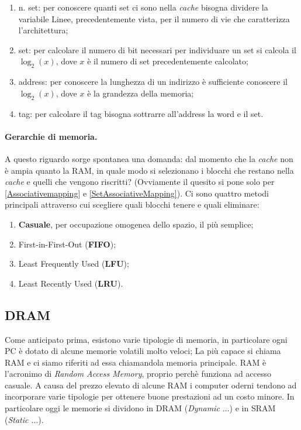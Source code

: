 \documentclass{article}
\begin{document}
\begin{enumerate}
\begin{enumerate}
  \item n. set: per conoscere quanti set ci sono nella \textit{cache} bisogna dividere la variabile Linee, precedentemente vista, per il numero di vie che caratterizza l'architettura;

  \item set: per calcolare il numero di bit necessari per individuare un set si calcola il $\log_2(x)$, dove $x$ è il numero di set precedentemente calcolato;

  \item address: per conoscere la lunghezza di un indirizzo è sufficiente conoscere il $\log_2(x)$, dove $x$ è la grandezza della memoria;

  \item tag: per calcolare il tag bisogna sottrarre all'address la word e il set.
\end{enumerate}

\end{enumerate}

\paragraph{Gerarchie di memoria.} A questo riguardo sorge spontanea una domanda: dal momento che la \textit{cache} non è ampia quanto la RAM, in quale modo si selezionano i blocchi che restano nella \textit{cache} e quelli che vengono riscritti? (Ovviamente il quesito si pone solo per \ref{Associativemapping} e \ref{SetAssociativeMapping}). Ci sono quattro metodi principali attraverso cui scegliere quali blocchi tenere e quali eliminare:
\begin{enumerate}
	\item \textbf{Casuale}, per occupazione omogenea dello spazio, il più semplice;

	\item \label{fifo} First-in-First-Out (\textbf{FIFO});

	\item Least Frequently Used (\textbf{LFU});

	\item Least Recently Used (\textbf{LRU}).

\end{enumerate}

\subsection{DRAM}

Come anticipato prima, esistono varie tipologie di memoria, in particolare ogni PC è dotato di alcune memorie volatili molto veloci; La più capace si chiama RAM e ci siamo riferiti ad essa chiamandola memoria principale. RAM è l'acronimo di \textit{Random Access Memory}, proprio perchè funziona ad accesso casuale. A causa del prezzo elevato di alcune RAM i computer oderni tendono ad incorporare varie tipologie per ottenere buone prestazioni ad un costo minore. In particolare oggi le memorie si dividono in DRAM (\textit{Dynamic $\dots$}) e in SRAM (\textit{Static $\dots$}).\\
\end{document}

